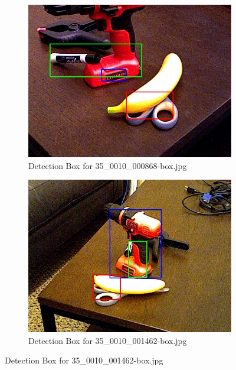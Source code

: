 \documentclass[10.5pt,a4paper]{article}
\begin{document}
\begin{figure}
    \vspace{2em}

    \begin{subfigure}{0.45\textwidth}
        \centering
        \includegraphics[width=\textwidth]{img/35_0010_000868-box.jpg}
        \caption{Detection Box for 35\_0010\_000868-box.jpg}
        \label{fig:img23}
    \end{subfigure}
    \hfill
    \begin{subfigure}{0.45\textwidth}
        \centering
        \includegraphics[width=\textwidth]{img/35_0010_001462-box.jpg}
        \caption{Detection Box for 35\_0010\_001462-box.jpg}
        \label{fig:img24}
    \end{subfigure}
    \end{figure}
\end{document}
